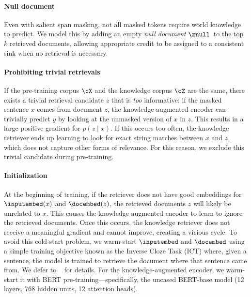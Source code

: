 \paragraph{Null document}
Even with salient span masking, not all masked tokens require world knowledge to predict. We model this by adding an empty \emph{null document} $\znull$~to the top $k$ retrieved documents, allowing appropriate credit to be assigned to a consistent sink when no retrieval is necessary.

\paragraph{Prohibiting trivial retrievals}
If the pre-training corpus $\cX$ and the knowledge corpus $\cZ$ are the same, there exists a trivial retrieval candidate $z$ that is \emph{too} informative: if the masked sentence $x$ comes from document $z$, the knowledge augmented encoder can trivially predict $y$ by looking at the unmasked version of $x$ in $z$. This results in a large positive gradient for $p(z\mid x)$. If this occurs too often, the knowledge retriever ends up learning to look for exact string matches between $x$ and $z$, which does not capture other forms of relevance. For this reason, we exclude this trivial candidate during pre-training.

\paragraph{Initialization}
At the beginning of training, if the retriever does not have good embeddings for $\inputembed(x)$ and $\docembed(z)$, the retrieved documents $z$ will likely be unrelated to $x$. This causes the knowledge augmented encoder to learn to ignore the retrieved documents. Once this occurs, the knowledge retriever does not receive a meaningful gradient and cannot improve, creating a vicious cycle. To avoid this cold-start problem, we warm-start $\inputembed$ and $\docembed$ using a simple training objective known as the Inverse Cloze Task (ICT) where, given a sentence, the model is trained to retrieve the document where that sentence came from. We defer to ~\citet{orqa} for details. For the knowledge-augmented encoder, we warm-start it with BERT pre-training---specifically, the uncased BERT-base model (12 layers, 768 hidden units, 12 attention heads).
